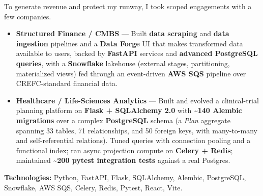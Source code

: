 \documentclass[10pt,a4paper]{altacv}
\begin{document}
\break
\newpage
{}


To generate revenue and protect my runway, I took scoped engagements with a few companies.
\begin{itemize}
\setlength{\itemindent}{0.5em}
\item[--] \textbf{Structured Finance / CMBS} — Built \textbf{data scraping} and \textbf{data ingestion} pipelines and a \textbf{Data Forge} UI that makes transformed data available to users, backed by \textbf{FastAPI} services and \textbf{advanced PostgreSQL queries}, with a \textbf{Snowflake} lakehouse (external stages, partitioning, materialized views) fed through an event-driven \textbf{AWS SQS} pipeline over CREFC-standard financial data.
\item[--] \textbf{Healthcare / Life-Sciences Analytics} — Built and evolved a clinical-trial planning platform on \textbf{Flask + SQLAlchemy 2.0} with \textbf{\textasciitilde140 Alembic migrations} over a complex \textbf{PostgreSQL} schema (a \emph{Plan} aggregate spanning 33 tables, 71 relationships, and 50 foreign keys, with many-to-many and self-referential relations). Tuned queries with connection pooling and a functional index; ran async projection compute on \textbf{Celery + Redis}; maintained \textbf{\textasciitilde200 pytest integration tests} against a real Postgres.
\end{itemize}
\textbf{Technologies:} Python, FastAPI, Flask, SQLAlchemy, Alembic, PostgreSQL, Snowflake, AWS SQS, Celery, Redis, Pytest, React, Vite.
\vspace{4mm}

\end{document}
